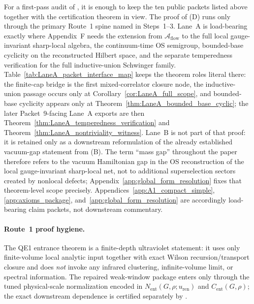 \begin{theorem}
\begin{remark}\label{rem:frozen_spine_scope}
For a first-pass audit of , it is enough to keep the ten public packets listed above together with the certification theorem  in view.
The proof of (D) runs only through the primary Route~1 spine named in Steps~1--3.
Lane~A is load-bearing exactly where Appendix~F needs the extension from $\mathcal A_{\mathrm{flow}}$ to the full local gauge-invariant sharp-local algebra, the continuum-time OS semigroup, bounded-base cyclicity on the reconstructed Hilbert space, and the separate temperedness verification for the full inductive-union Schwinger family.
Table~\ref{tab:LaneA_packet_interface_map} keeps the theorem roles literal there: the finite-cap bridge is the first mixed-correlator closure node, the inductive-union passage occurs only at Corollary~\ref{cor:LaneA_full_scope}, and bounded-base cyclicity appears only at Theorem~\ref{thm:LaneA_bounded_base_cyclic}; the later Packet~9-facing Lane~A exports are then Theorem~\ref{thm:LaneA_temperedness_verification} and Theorem~\ref{thm:LaneA_nontriviality_witness}.
Lane~B is not part of that proof: it is retained only as a downstream reformulation of the already established vacuum-gap statement from (B).
The term ``mass gap'' throughout the paper therefore refers to the vacuum Hamiltonian gap in the OS reconstruction of the local gauge-invariant sharp-local net, not to additional superselection sectors created by nonlocal defects; Appendix~\ref{app:global_form_resolution} fixes that theorem-level scope precisely. Appendices~\ref{app:A1_compact_simple}, \ref{app:axioms_package}, and~\ref{app:global_form_resolution} are accordingly load-bearing claim packets, not downstream commentary.
\end{remark}

\paragraph{Route~1 proof hygiene.}
The QE1 entrance theorem is a finite-depth ultraviolet statement: it uses only finite-volume local analytic input together with exact Wilson recursion/transport closure and does \emph{not} invoke any infrared clustering, infinite-volume limit, or spectral information.
The repaired weak-window package enters only through the tuned physical-scale normalization encoded in $N_{\mathrm{ent}}(G,\rho;u_{\mathrm{ren}})$ and $C_{\mathrm{ent}}(G,\rho)$; the exact downstream dependence is certified separately by .
\end{theorem}

